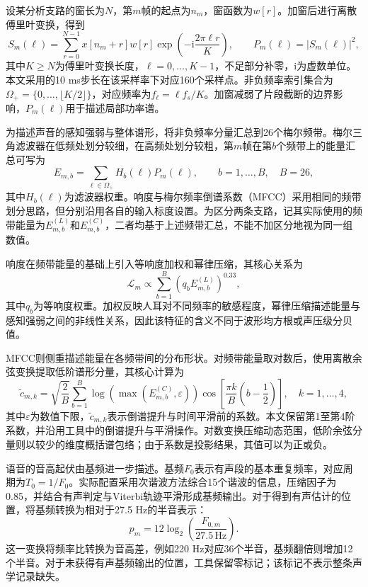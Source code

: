 设某分析支路的窗长为$N$，第$m$帧的起点为$n_m$，窗函数为$w[r]$。加窗后进行离散傅里叶变换，得到
\begin{equation}
    S_m(\ell)=\sum_{r=0}^{N-1}x[n_m+r]w[r]
    \exp\!\left(-\mathrm{i}\frac{2\pi\ell r}{K}\right),
    \qquad P_m(\ell)=|S_m(\ell)|^2,
    \label{eq:p1_audio_spectrum}
\end{equation}
其中$K\geq N$为傅里叶变换长度，$\ell=0,\ldots,K-1$，不足部分补零，$\mathrm{i}$为虚数单位。本文采用的10 ms步长在该采样率下对应160个采样点。非负频率索引集合为$\Omega_+=\{0,\ldots,\lfloor K/2\rfloor\}$，对应频率为$f_\ell=\ell f_s/K$。加窗减弱了片段截断的边界影响，$P_m(\ell)$用于描述局部功率谱。

为描述声音的感知强弱与整体谱形，将非负频率分量汇总到26个梅尔频带。梅尔三角滤波器在低频处划分较细，在高频处划分较粗，第$m$帧在第$b$个频带上的能量汇总可写为
\begin{equation}
    E_{m,b}=\sum_{\ell\in\Omega_+}H_b(\ell)P_m(\ell),
    \qquad b=1,\ldots,B,\quad B=26,
    \label{eq:p1_mel_energy}
\end{equation}
其中$H_b(\ell)$为滤波器权重。响度与梅尔频率倒谱系数（MFCC）采用相同的频带划分思路，但分别沿用各自的输入标度设置。为区分两条支路，记其实际使用的频带能量为$E^{(L)}_{m,b}$和$E^{(C)}_{m,b}$，二者均基于上述频带汇总，不能不加区分地视为同一组数值。

响度在频带能量的基础上引入等响度加权和幂律压缩，其核心关系为
\begin{equation}
    \mathcal{L}_m\propto\sum_{b=1}^{B}
    \left(q_bE^{(L)}_{m,b}\right)^{0.33},
    \label{eq:p1_loudness}
\end{equation}
其中$q_b$为等响度权重。加权反映人耳对不同频率的敏感程度，幂律压缩描述能量与感知强弱之间的非线性关系，因此该特征的含义不同于波形均方根或声压级分贝值。

MFCC则侧重描述能量在各频带间的分布形状。对频带能量取对数后，使用离散余弦变换提取低阶谱形分量，其核心计算为
\begin{equation}
    \widetilde c_{m,k}=\sqrt{\frac{2}{B}}
    \sum_{b=1}^{B}\log\!\left(\max\!\left(E^{(C)}_{m,b},\varepsilon\right)\right)
    \cos\!\left[\frac{\pi k}{B}\left(b-\frac12\right)\right],
    \quad k=1,\ldots,4,
    \label{eq:p1_mfcc}
\end{equation}
其中$\varepsilon$为数值下限，$\widetilde c_{m,k}$表示倒谱提升与时间平滑前的系数。本文保留第1至第4阶系数，并沿用工具中的倒谱提升与平滑操作。对数变换压缩动态范围，低阶余弦分量则以较少的维度概括谱包络；由于系数是投影结果，其值可以为正或负。

语音的音高起伏由基频进一步描述。基频$F_0$表示有声段的基本重复频率，对应周期为$T_0=1/F_0$。实际配置采用次谐波方法综合15个谐波的信息，压缩因子为0.85，并结合有声判定与Viterbi轨迹平滑形成基频输出。对于得到有声估计的位置，将基频转换为相对于27.5 Hz的半音表示：
\begin{equation}
    p_m=12\log_2\!\left(\frac{F_{0,m}}{27.5\,\mathrm{Hz}}\right).
    \label{eq:p1_pitch_semitone}
\end{equation}
这一变换将频率比转换为音高差，例如220 Hz对应36个半音，基频翻倍则增加12个半音。对于未获得有声基频输出的位置，工具保留零标记；该标记不表示整条声学记录缺失。


